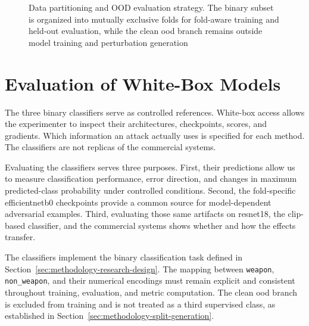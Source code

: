 \begin{figure}[H]
{%
}
\caption[Data partitioning and OOD evaluation strategy]{Data partitioning and
OOD evaluation strategy. The binary subset is organized into mutually exclusive
folds for fold-aware training and held-out evaluation, while the clean
\gls{ood} branch remains outside model training and perturbation generation}
\label{fig:methodology-split-to-proxy-training}
\end{figure}

\section{Evaluation of White-Box Models}
\label{sec:methodology-models-classification}

The three binary classifiers serve as controlled references. White-box access
allows the experimenter to inspect their architectures, checkpoints, scores,
and gradients. Which information an attack actually uses is specified for each
method. The classifiers are not replicas of the commercial systems.

Evaluating the classifiers serves three purposes. First, their predictions
allow us to measure classification performance, error direction, and changes
in maximum predicted-class probability under controlled conditions. Second,
the fold-specific \gls{efficientnetb0} checkpoints provide a common source for
model-dependent adversarial examples. Third, evaluating those same artifacts on
\gls{resnet18}, the \gls{clip}-based classifier, and the commercial systems
shows whether and how the effects transfer.

The classifiers implement the binary classification task defined in
Section~\ref{sec:methodology-research-design}. The mapping between
\texttt{weapon}, \texttt{non\_weapon}, and their numerical encodings must
remain explicit and consistent throughout training, evaluation, and metric
computation. The clean \gls{ood} branch is excluded from training and is not
treated as a third supervised class, as established in
Section~\ref{sec:methodology-split-generation}.

